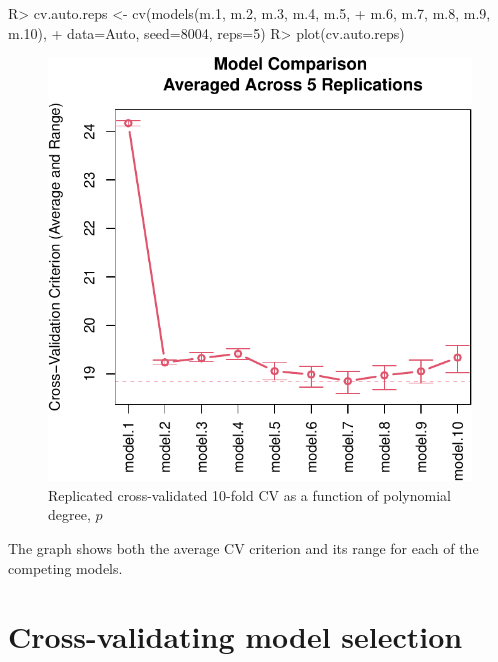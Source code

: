 \documentclass[
]{jss}
\begin{document}
\begin{CodeChunk}
\begin{CodeInput}
R> cv.auto.reps <- cv(models(m.1, m.2, m.3, m.4, m.5,
+                         m.6, m.7, m.8, m.9, m.10),
+                  data=Auto, seed=8004, reps=5)
R> plot(cv.auto.reps)
\end{CodeInput}
\begin{figure}

{\centering \includegraphics[width=1\linewidth]{JSS-article_files/figure-latex/model-comparison-with-reps-1} 

}

\caption[ Replicated cross-validated 10-fold CV as a function of polynomial degree, $p$]{ Replicated cross-validated 10-fold CV as a function of polynomial degree, $p$}\label{fig:model-comparison-with-reps}
\end{figure}
\end{CodeChunk}

The graph shows both the average CV criterion and its range for each of
the competing models.

\hypertarget{cross-validating-model-selection}{%
\section{Cross-validating model
selection}\label{cross-validating-model-selection}}
\end{document}
